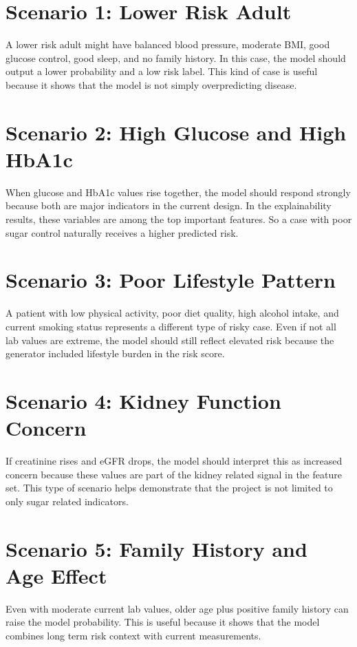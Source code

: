 \documentclass[12pt,a4paper,openany]{report}
\begin{document}
    \section{Scenario 1: Lower Risk Adult}
    A lower risk adult might have balanced blood pressure, moderate BMI, good glucose control, good sleep, and no family history. In this case, the model should output a lower probability and a low risk label. This kind of case is useful because it shows that the model is not simply overpredicting disease.

    \section{Scenario 2: High Glucose and High HbA1c}
    When glucose and HbA1c values rise together, the model should respond strongly because both are major indicators in the current design. In the explainability results, these variables are among the top important features. So a case with poor sugar control naturally receives a higher predicted risk.

    \section{Scenario 3: Poor Lifestyle Pattern}
    A patient with low physical activity, poor diet quality, high alcohol intake, and current smoking status represents a different type of risky case. Even if not all lab values are extreme, the model should still reflect elevated risk because the generator included lifestyle burden in the risk score.

    \section{Scenario 4: Kidney Function Concern}
    If creatinine rises and eGFR drops, the model should interpret this as increased concern because these values are part of the kidney related signal in the feature set. This type of scenario helps demonstrate that the project is not limited to only sugar related indicators.

    \section{Scenario 5: Family History and Age Effect}
    Even with moderate current lab values, older age plus positive family history can raise the model probability. This is useful because it shows that the model combines long term risk context with current measurements.
\end{document}
